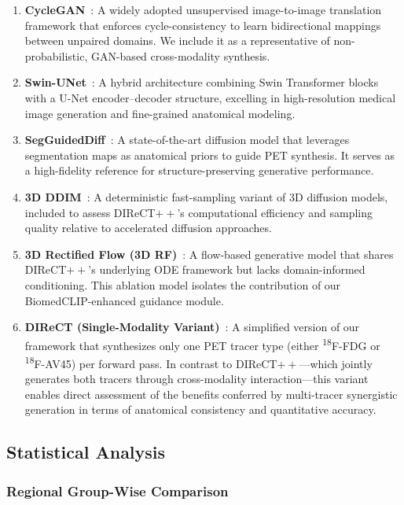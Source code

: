 \documentclass{article}
\begin{document}
\begin{enumerate}
    \item \textbf{CycleGAN}~\cite{zhu2017unpaired}: A widely adopted unsupervised image-to-image translation framework that enforces cycle-consistency to learn bidirectional mappings between unpaired domains. We include it as a representative of non-probabilistic, GAN-based cross-modality synthesis.

    \item \textbf{Swin-UNet}~\cite{Cao2021swin}: A hybrid architecture combining Swin Transformer blocks with a U-Net encoder–decoder structure, excelling in high-resolution medical image generation and fine-grained anatomical modeling.

    \item \textbf{SegGuidedDiff}~\cite{konz2024anatomically}: A state-of-the-art diffusion model that leverages segmentation maps as anatomical priors to guide PET synthesis. It serves as a high-fidelity reference for structure-preserving generative performance.

    \item \textbf{3D DDIM}~\cite{Graf2023}: A deterministic fast-sampling variant of 3D diffusion models, included to assess DIReCT$++$’s computational efficiency and sampling quality relative to accelerated diffusion approaches.

    \item \textbf{3D Rectified Flow (3D RF)}~\cite{Xing2022}: A flow-based generative model that shares DIReCT$++$’s underlying ODE framework but lacks domain-informed conditioning. This ablation model isolates the contribution of our BiomedCLIP-enhanced guidance module.

    \item \textbf{DIReCT (Single-Modality Variant)}~\cite{liu2025direct}: A simplified version of our framework that synthesizes only one PET tracer type (either \textsuperscript{18}F-FDG or \textsuperscript{18}F-AV45) per forward pass. In contrast to DIReCT$++$—which jointly generates both tracers through cross-modality interaction—this variant enables direct assessment of the benefits conferred by multi-tracer synergistic generation in terms of anatomical consistency and quantitative accuracy.
\end{enumerate}

\subsection{Statistical Analysis}
\subsubsection{Regional Group-Wise Comparison}
\end{document}
